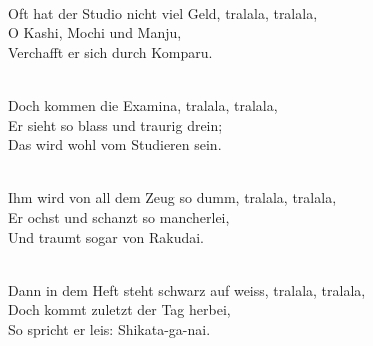 \documentclass[10pt,b5j]{tarticle} %
\begin{document}
\begin{enumerate}
\begin{minipage}[c]{\blocksize}
    \end{minipage}
    \begin{minipage}[c]{\blocksize}
        
        \vspace{\linespace}
        \item~\\
        Oft hat der Studio nicht viel Geld, tralala, tralala,\\
        O Kashi, Mochi und Manju,\\
        Verchafft er sich durch Komparu.
        
    \end{minipage}
    \begin{minipage}[c]{\blocksize}
        
        \vspace{\linespace}
        \item~\\
        Doch kommen die Examina, tralala, tralala,\\
        Er sieht so blass und traurig drein;\\
        Das wird wohl vom Studieren sein.
        
    \end{minipage}
    \begin{minipage}[c]{\blocksize}
        
        \vspace{\linespace}
        \item~\\
        Ihm wird von all dem Zeug so dumm, tralala, tralala,\\
        Er ochst und schanzt so mancherlei,\\
        Und traumt sogar von Rakudai.
        
    \end{minipage}
    \begin{minipage}[c]{\blocksize}
        
        \vspace{\linespace}
        \item~\\
        Dann in dem Heft steht schwarz auf weiss, tralala, tralala,\\
        Doch kommt zuletzt der Tag herbei,\\
        So spricht er leis: Shikata-ga-nai.
        

\end{minipage}
\end{enumerate}
\end{document}
